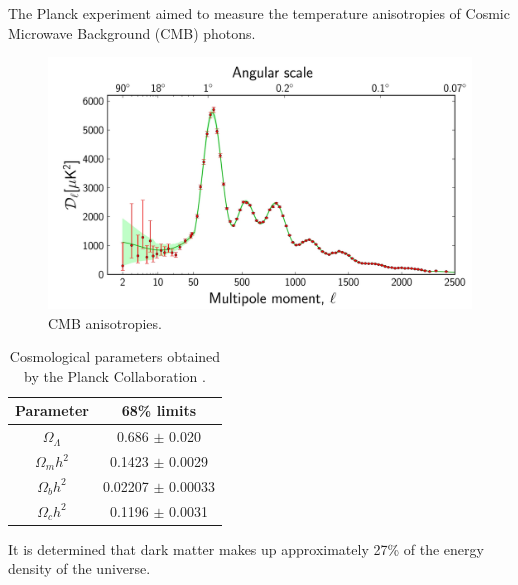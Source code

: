The Planck experiment \cite{PlanckI:2013} aimed to measure the temperature anisotropies of Cosmic Microwave Background (CMB) photons. 

\begin{figure}[h]
  \label{fig:intro:CMB}
  \includegraphics[width=\textwidth]{CMBanisotropies.jpg}
  \caption[CMB anisotropies measured by the Planck experiment]{CMB anisotropies.}
\end{figure}


\begin{table}
  \begin{center}
	\begin{tabular}{cc}
        \hline\hline
        Parameter & 68\% limits \\
        \hline
        $\Omega_\Lambda$ & 0.686 $\pm$ 0.020 \\
        $\Omega_m h^2$ & 0.1423 $\pm$ 0.0029 \\
        $\Omega_b h^2$ & 0.02207 $\pm$ 0.00033 \\
        $\Omega_c h^2$ & 0.1196 $\pm$ 0.0031 \\
        \hline\hline
	\end{tabular}
  \end{center}
  \caption[Cosmological parameters obtained by the Planck Collaboration]{Cosmological parameters obtained by the Planck Collaboration \cite{PlanckXVI:2013}.}
  \label{tab:Planck}
\end{table}

It is determined that dark matter makes up approximately 27\% of the energy density of the universe.